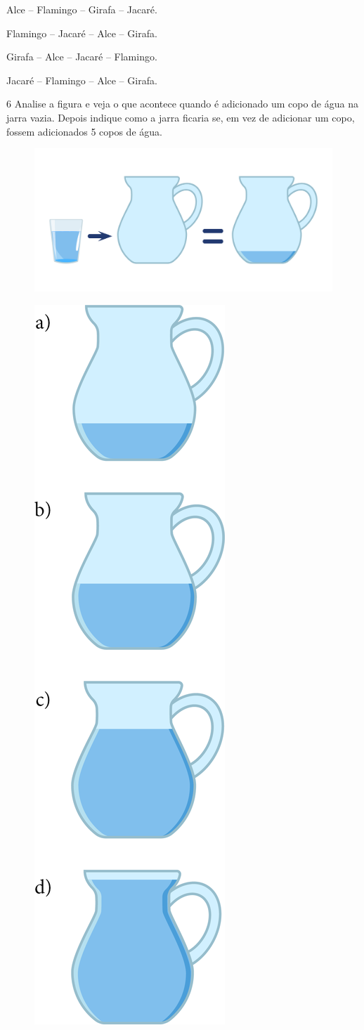 \begin{escolha}[itemsep=-5pt]
\item Alce -- Flamingo -- Girafa -- Jacaré.

\item Flamingo -- Jacaré -- Alce -- Girafa.

\item Girafa -- Alce -- Jacaré -- Flamingo.

\item Jacaré -- Flamingo -- Alce -- Girafa.
\end{escolha}

\num{6} Analise a figura e veja o que acontece quando é adicionado um copo de
água na jarra vazia. Depois indique como a jarra ficaria se, em vez de
adicionar um copo, fossem adicionados 5 copos de água.

\begin{figure}[H]
\centering
\includegraphics[width=\textwidth]{./media/image140.png}
\end{figure}

\begin{figure}[H]
\includegraphics[width=.2\textwidth]{./media/image141.png}
\end{figure}

